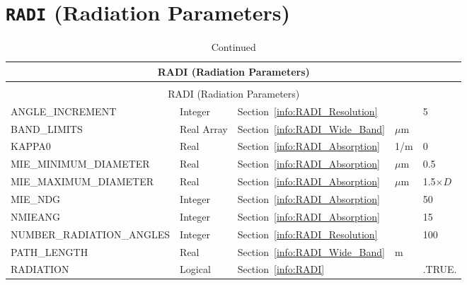 \documentclass[11pt]{book}
\begin{document}
\section{\texorpdfstring{{\tt RADI}}{RADI} (Radiation Parameters)}

\begin{longtable}{@{\extracolsep{\fill}}|l|l|l|l|l|}
\caption[Radiation parameters ({\ct RADI} namelist group)]{For more information see Section~\ref{info:RADI}.}
\label{tbl:RADI} \\
\hline
\multicolumn{5}{|c|}{{\ct RADI} (Radiation Parameters)} \\
\hline \hline
\endfirsthead
\caption[]{Continued} \\
\hline
\multicolumn{5}{|c|}{{\ct RADI} (Radiation Parameters)} \\
\hline \hline
\endhead
{\ct ANGLE\_INCREMENT}              & Integer       & Section~\ref{info:RADI_Resolution}        &                   & 5                 \\ \hline
{\ct BAND\_LIMITS    }              & Real Array    & Section~\ref{info:RADI_Wide_Band}         &  $\mu$m           &                   \\ \hline
{\ct KAPPA0                   }     & Real          & Section~\ref{info:RADI_Absorption}        & 1/m               & 0                 \\ \hline
{\ct MIE\_MINIMUM\_DIAMETER}        & Real          & Section~\ref{info:RADI_Absorption}        & $\mu$m            & 0.5               \\ \hline
{\ct MIE\_MAXIMUM\_DIAMETER}        & Real          & Section~\ref{info:RADI_Absorption}        & $\mu$m            & 1.5$\times D$     \\ \hline
{\ct MIE\_NDG}                      & Integer       & Section~\ref{info:RADI_Absorption}        &                   & 50                \\ \hline
{\ct NMIEANG                  }     & Integer       & Section~\ref{info:RADI_Absorption}        &                   & 15                \\ \hline
{\ct NUMBER\_RADIATION\_ANGLES}     & Integer       & Section~\ref{info:RADI_Resolution}        &                   & 100               \\ \hline
{\ct PATH\_LENGTH }                 & Real          & Section~\ref{info:RADI_Wide_Band}         &   m               &                   \\ \hline
{\ct RADIATION}                     & Logical       & Section~\ref{info:RADI}                   &                   & {\ct .TRUE.}      \\ \hline

\end{longtable}
\end{document}
